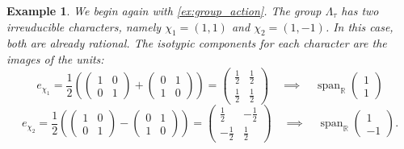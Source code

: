 \documentclass[a4paper,11pt]{article}
\newtheorem{example}[theorem]{Example}
\numberwithin{equation}{section}
\begin{document}
\begin{example}
    We begin again with \cref{ex:group_action}. The group $\Lambda_\tau$ has two irreuducible characters, namely $\chi_1 = (1,1)$ and $\chi_2 = (1,-1)$. In this case, both are already rational. The isotypic components for each character are the images of the units:
    \[
        e_{\chi_1} = \frac{1}{2}\left(
        \begin{pmatrix}
            1 & 0 \\ 0 & 1
        \end{pmatrix}
        +
        \begin{pmatrix}
            0 & 1 \\ 1 & 0
        \end{pmatrix}
        \right)
        =
        \begin{pmatrix}
            \frac{1}{2} & \frac{1}{2}  \\ \frac{1}{2}  & \frac{1}{2} 
        \end{pmatrix}
        \quad \implies
        \quad
        \operatorname{span}_{\mathbb R}
        \begin{pmatrix}
            1 \\ 1
        \end{pmatrix}
    \]
    \[
        e_{\chi_2} = \frac{1}{2}\left(
        \begin{pmatrix}
            1 & 0 \\ 0 & 1
        \end{pmatrix}
        -
        \begin{pmatrix}
            0 & 1 \\ 1 & 0
        \end{pmatrix}
        \right)
        =
        \begin{pmatrix}
            \frac{1}{2} & -\frac{1}{2}  \\ -\frac{1}{2}  & \frac{1}{2} 
        \end{pmatrix}
        \quad \implies
        \quad 
        \operatorname{span}_{\mathbb R}
        \begin{pmatrix}
            1 \\ -1
        \end{pmatrix}.
    \]
\end{example}
\end{document}
